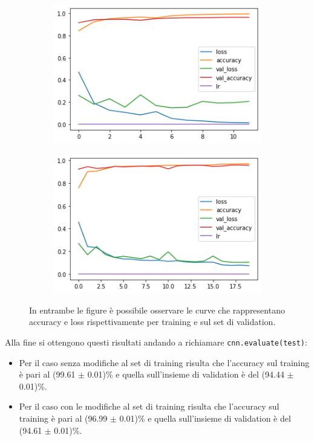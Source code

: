   \begin{figure}[H]
    \begin{subfigure}{0.55\textwidth}
      \centering
      \includegraphics[width=0.95\linewidth]{Figures/history-pneumonia-no-aug.png}
      \caption{}
      \label{fig:snap1}
    \end{subfigure}%
    \begin{subfigure}{0.55\textwidth}
      \centering
      \includegraphics[width=.95\linewidth]{Figures/history-pneumonia-aug1.png}
      \caption{}
      \label{fig:snap2}
    \end{subfigure}%
    \caption{In entrambe le figure è possibile osservare le curve che rappresentano accuracy e loss rispettivamente per training e sul set di validation.}
    \label{fig:fig}
\end{figure} 
Alla fine si ottengono questi risultati andando a richiamare \lstinline{cnn.evaluate(test)}:
\begin{itemize}
  \item Per il caso senza modifiche al set di training risulta che l'accuracy sul training è pari al (99.61 $\pm$ 0.01)\% e quella sull'insieme di validation è del (94.44 $\pm$ 0.01)\%.
  \item  Per il caso con le modifiche al set di training risulta che l'accuracy sul training è pari al (96.99 $\pm$ 0.01)\% e quella sull'insieme di validation è del (94.61 $\pm$ 0.01)\%.
  
\end{itemize}


